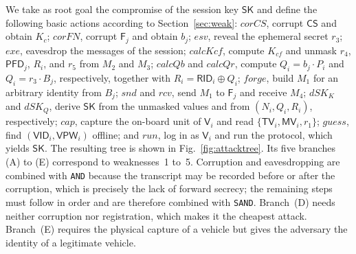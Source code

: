 \documentclass[journal]{IEEEtran}
\theoremstyle{plain}
\theoremstyle{definition}
\newcommand{\Veh}{\mathsf{V}}            %
\newcommand{\Fog}{\mathsf{F}}            %
\newcommand{\CS}{\mathsf{CS}}            %
\newcommand{\SK}{\mathsf{SK}}            %
\newcommand{\VID}{\mathsf{VID}}          %
\newcommand{\VPW}{\mathsf{VPW}}          %
\newcommand{\TV}{\mathsf{TV}}            %
\newcommand{\MV}{\mathsf{MV}}
\newcommand{\RID}{\mathsf{RID}}
\newcommand{\PFD}{\mathsf{PFD}}
\begin{document}
We take as root goal the compromise of the session key $\SK$ and define the following basic actions according to Section~\ref{sec:weak}: $\mathit{corCS}$, corrupt $\CS$ and obtain $K_c$; $\mathit{corFN}$, corrupt $\Fog_j$ and obtain $b_j$; $\mathit{esv}$, reveal the ephemeral secret $r_3$; $\mathit{exe}$, eavesdrop the messages of the session; $\mathit{calcKcf}$, compute $K_{cf}$ and unmask $r_4$, $\PFD_j$, $R_i$, and $r_5$ from $M_2$ and $M_3$; $\mathit{calcQb}$ and $\mathit{calcQr}$, compute $Q_i=b_j\cdot P_i$ and $Q_i=r_3\cdot B_j$, respectively, together with $R_i=\RID_i\oplus Q_i$; $\mathit{forge}$, build $M_1$ for an arbitrary identity from $B_j$; $\mathit{snd}$ and $\mathit{rcv}$, send $M_1$ to $\Fog_j$ and receive $M_4$; $\mathit{dSK}_K$ and $\mathit{dSK}_Q$, derive $\SK$ from the unmasked values and from $(N_i,Q_i,R_i)$, respectively; $\mathit{cap}$, capture the on-board unit of $\Veh_i$ and read $\{\TV_i,\MV_i,r_1\}$; $\mathit{guess}$, find $(\VID_i,\VPW_i)$ offline; and $\mathit{run}$, log in as $\Veh_i$ and run the protocol, which yields $\SK$. The resulting tree is shown in Fig.~\ref{fig:attacktree}. Its five branches (A) to (E) correspond to weaknesses~1 to~5. Corruption and eavesdropping are combined with \texttt{AND} because the transcript may be recorded before or after the corruption, which is precisely the lack of forward secrecy; the remaining steps must follow in order and are therefore combined with \texttt{SAND}. Branch~(D) needs neither corruption nor registration, which makes it the cheapest attack. Branch~(E) requires the physical capture of a vehicle but gives the adversary the identity of a legitimate vehicle.
\end{document}
